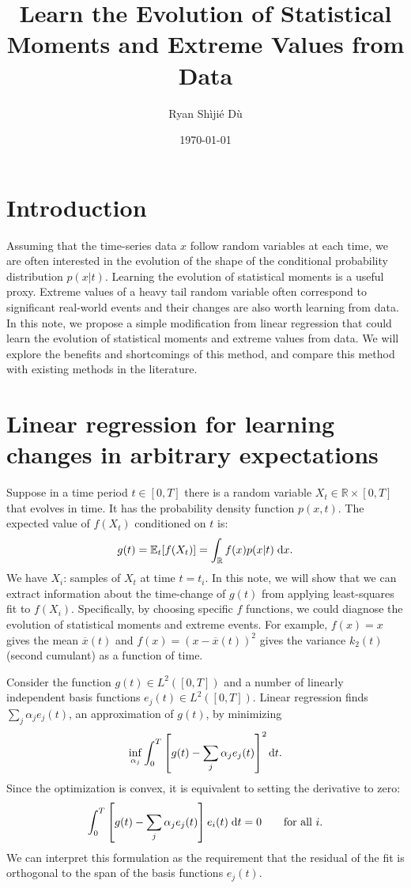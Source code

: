 \documentclass[11pt,letterpaper]{article}
\title{Learn the Evolution of Statistical Moments and Extreme Values from Data}
\author{Ryan Sh\`iji\'e D\`u}
\date{\today}
\begin{document}

\maketitle

\section{Introduction}
Assuming that the time-series data $x$ follow random variables at each time, we are often interested in the evolution of the shape of the conditional probability distribution $p(x|t)$. Learning the evolution of statistical moments is a useful proxy. Extreme values of a heavy tail random variable often correspond to significant real-world events and their changes are also worth learning from data. In this note, we propose a simple modification from linear regression that could learn the evolution of statistical moments and extreme values from data. We will explore the benefits and shortcomings of this method, and compare this method with existing methods in the literature.

\section{Linear regression for learning changes in arbitrary expectations}
Suppose in a time period $t\in [0,T]$ there is a random variable $X_t\in\mathbb{R}\times[0,T]$ that evolves in time. It has the probability density function $p(x,t)$. The expected value of $f(X_t)$ conditioned on $t$ is:
\begin{align}
    g(t) = \mathbb{E}_t[f(X_t)] = \int_\mathbb{R} f(x)p(x|t)\;\mathrm{d} x.\label{eq:expectation_fg}
\end{align}
We have $X_i$: samples of $X_t$ at time $t = t_i$. In this note, we will show that we can extract information about the time-change of $g(t)$ from applying least-squares fit to $f(X_i)$. Specifically, by choosing specific $f$ functions, we could diagnose the evolution of statistical moments and extreme events. For example, $f(x) = x$ gives the mean $\overline{x}(t)$ and $f(x) = (x-\overline{x}(t))^2$ gives the variance $k_2(t)$ (second cumulant) as a function of time. 

Consider the function $g(t)\in L^2([0,T])$ and a number of linearly independent basis functions $e_j(t)\in L^2([0,T])$. Linear regression finds $\sum_j\alpha_j e_j(t)$, an approximation of $g(t)$, by minimizing
\begin{align}
    \inf_{\alpha_j} \int_0^T \left[ g(t)-\sum_j\alpha_je_j(t) \right]^2\mathrm{d} t.
\end{align}
Since the optimization is convex, it is equivalent to setting the derivative to zero:
\begin{align}
    \int_0^T \left[ g(t)-\sum_j\alpha_je_j(t) \right]e_i(t)\;\mathrm{d} t = 0\label{eq:leastsq_proj}\quad \mbox{} \quad \text{for all $i$.}
\end{align}
We can interpret this formulation as the requirement that the residual of the fit is orthogonal to the span of the basis functions $e_j(t)$. 
\end{document}
